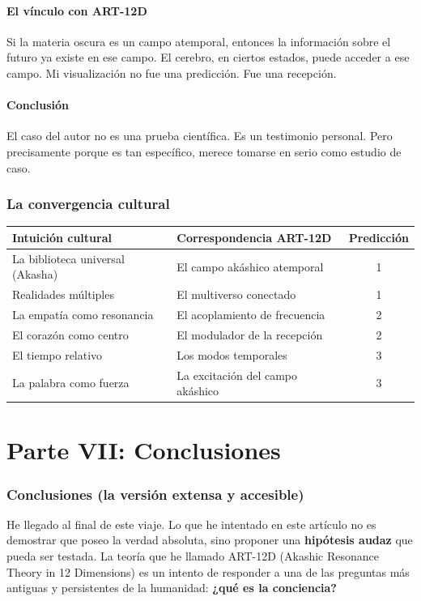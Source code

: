 \documentclass[11pt,a4paper]{article}
\begin{document}
\subsection{El vínculo con ART-12D}
Si la materia oscura es un campo atemporal, entonces la información sobre el futuro ya existe en ese campo. El cerebro, en ciertos estados, puede acceder a ese campo. Mi visualización no fue una predicción. Fue una recepción.

\subsection{Conclusión}
El caso del autor no es una prueba científica. Es un testimonio personal. Pero precisamente porque es tan específico, merece tomarse en serio como estudio de caso.

\section{La convergencia cultural}
\begin{table}[H]
\centering
\begin{tabular}{@{}llc@{}}
\toprule
\textbf{Intuición cultural} & \textbf{Correspondencia ART-12D} & \textbf{Predicción} \\ \midrule
La biblioteca universal (Akasha) & El campo akáshico atemporal & 1 \\
Realidades múltiples & El multiverso conectado & 1 \\
La empatía como resonancia & El acoplamiento de frecuencia & 2 \\
El corazón como centro & El modulador de la recepción & 2 \\
El tiempo relativo & Los modos temporales & 3 \\
La palabra como fuerza & La excitación del campo akáshico & 3 \\ \bottomrule
\end{tabular}
\end{table}

\newpage
\part*{Parte VII: Conclusiones}

\section{Conclusiones (la versión extensa y accesible)}
He llegado al final de este viaje. Lo que he intentado en este artículo no es demostrar que poseo la verdad absoluta, sino proponer una \textbf{hipótesis audaz} que pueda ser testada. La teoría que he llamado ART-12D (Akashic Resonance Theory in 12 Dimensions) es un intento de responder a una de las preguntas más antiguas y persistentes de la humanidad: \textbf{¿qué es la conciencia?}
\end{document}
